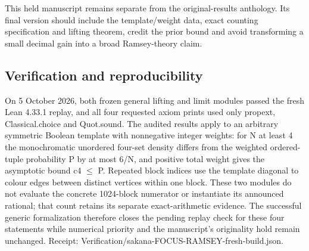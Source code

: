 \documentclass[11pt,a4paper]{article}
\begin{document}
This held manuscript remains separate from the original-results anthology. Its final version should include the template/weight data, exact counting specification and lifting theorem, credit the prior bound and avoid transforming a small decimal gain into a broad Ramsey-theory claim.

\subsection{Verification and reproducibility}
On 5 October 2026, both frozen general lifting and limit modules passed the fresh Lean 4.33.1 replay, and all four requested axiom prints used only propext, Classical.choice and Quot.sound. The audited results apply to an arbitrary symmetric Boolean template with nonnegative integer weights: for N at least 4 the monochromatic unordered four-set density differs from the weighted ordered-tuple probability P by at most 6/N, and positive total weight gives the asymptotic bound c4 \ensuremath{\leq} P. Repeated block indices use the template diagonal to colour edges between distinct vertices within one block. These two modules do not evaluate the concrete 1024-block numerator or instantiate its announced rational; that count retains its separate exact-arithmetic evidence. The successful generic formalization therefore closes the pending replay check for these four statements while numerical priority and the manuscript's originality hold remain unchanged. Receipt: Verification/sakana-FOCUS-RAMSEY-fresh-build.json.
\end{document}
